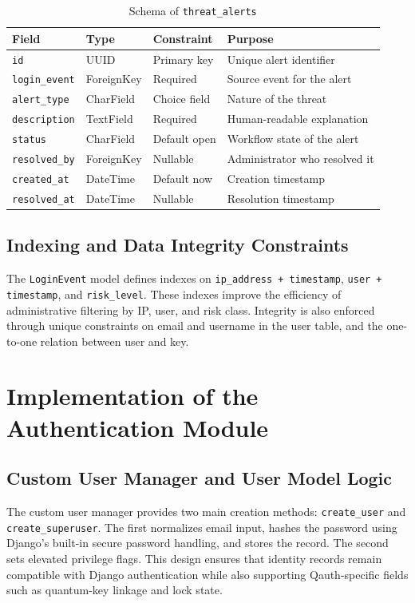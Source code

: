 \begin{table}[H]
\centering
\small
\caption{Schema of \texttt{threat\_alerts}}
\label{tab:threat-alerts}
\begin{tabular}{|p{3.0cm}|p{2.8cm}|p{1.8cm}|p{6.0cm}|}
\hline
\textbf{Field} & \textbf{Type} & \textbf{Constraint} & \textbf{Purpose} \\
\hline
\texttt{id} & UUID & Primary key & Unique alert identifier \\
\hline
\texttt{login\_event} & ForeignKey & Required & Source event for the alert \\
\hline
\texttt{alert\_type} & CharField & Choice field & Nature of the threat \\
\hline
\texttt{description} & TextField & Required & Human-readable explanation \\
\hline
\texttt{status} & CharField & Default open & Workflow state of the alert \\
\hline
\texttt{resolved\_by} & ForeignKey & Nullable & Administrator who resolved it \\
\hline
\texttt{created\_at} & DateTime & Default now & Creation timestamp \\
\hline
\texttt{resolved\_at} & DateTime & Nullable & Resolution timestamp \\
\hline
\end{tabular}
\end{table}

\subsection{Indexing and Data Integrity Constraints}
The \texttt{LoginEvent} model defines indexes on \texttt{ip\_address + timestamp}, \texttt{user + timestamp}, and \texttt{risk\_level}. These indexes improve the efficiency of administrative filtering by IP, user, and risk class. Integrity is also enforced through unique constraints on email and username in the user table, and the one-to-one relation between user and key.

\section{Implementation of the Authentication Module}

\subsection{Custom User Manager and User Model Logic}
The custom user manager provides two main creation methods: \texttt{create\_user} and \texttt{create\_superuser}. The first normalizes email input, hashes the password using Django's built-in secure password handling, and stores the record. The second sets elevated privilege flags. This design ensures that identity records remain compatible with Django authentication while also supporting Qauth-specific fields such as quantum-key linkage and lock state.

